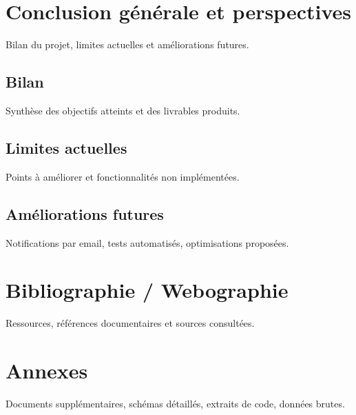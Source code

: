 \documentclass[14pt,a4paper]{article}
\begin{document}
\newpage
\section*{Conclusion générale et perspectives}

\hspace{.8cm} Bilan du projet, limites actuelles et améliorations futures.

\subsection*{Bilan}
\hspace{.8cm} Synthèse des objectifs atteints et des livrables produits.

\subsection*{Limites actuelles}
\hspace{.8cm} Points à améliorer et fonctionnalités non implémentées.

\subsection*{Améliorations futures}
\hspace{.8cm} Notifications par email, tests automatisés, optimisations proposées.

\newpage
\section*{Bibliographie / Webographie}

\hspace{.8cm} Ressources, références documentaires et sources consultées.

\newpage
\section*{Annexes}

\hspace{.8cm} Documents supplémentaires, schémas détaillés, extraits de code, données brutes.
\end{document}
